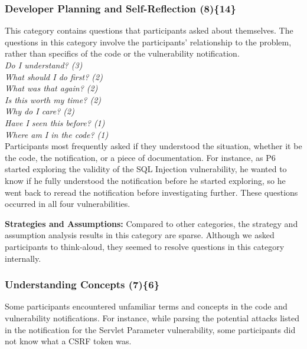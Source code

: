\documentclass[10pt,journal,compsoc]{IEEEtran}
\begin{document}
\label{sec:results-i}

\subsubsection{Developer Planning and Self-Reflection (8)\{14\}}
\label{dpr}
 
This category contains questions that participants asked about themselves.
The questions in this category involve the participants' relationship to the problem, rather than specifics of the code or the vulnerability notification.
\\

\noindent\emph{Do I understand? (3)} \\
\emph{What should I do first? (2)} \\
\emph{What was that again? (2)} \\
\emph{Is this worth my time? (2)} \\
\emph{Why do I care? (2)} \\
\emph{Have I seen this before? (1)} \\
\emph{Where am I in the code? (1)} 
\\

Participants most frequently asked if they understood the situation, whether it be the code, the notification, or a piece of documentation. 
For instance, as P6 started exploring the validity of the SQL Injection vulnerability, he wanted to know if he fully understood the notification before he started exploring, so he went back to reread the notification before investigating further.
These questions occurred in all four vulnerabilities.


\textbf{Strategies and Assumptions:}
Compared to other categories, the strategy and assumption analysis results in this category are sparse.
Although we asked participants to think-aloud, they seemed to resolve questions in this category internally. 



\subsubsection{Understanding Concepts (7)\{6\}}\label{uc}

Some participants encountered unfamiliar terms and concepts in the code and vulnerability notifications.
For instance, while parsing the potential attacks listed in the notification for the Servlet Parameter vulnerability, some participants did not know what a CSRF token was.
\\
\end{document}
